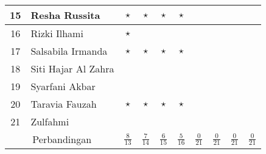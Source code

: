 \documentclass[a4paper]{tufte-handout}
\begin{document}
\begin{table}[!ht]
\begin{tabular}{cl|c|c|c|c|c|c|c|c}
15 	& Resha Russita				& $\star$ & $\star$ & $\star$ & $\star$ & & & & \\ \hline
16 	& Rizki Ilhami				& $\star$ & & & & & & & \\ \hline
17 	& Salsabila Irmanda			& $\star$ & $\star$ & $\star$ & $\star$ & & & & \\ \hline
18 	& Siti Hajar Al Zahra		& & & & & & & & \\ \hline
19 	& Syarfani Akbar			& & & & & & & & \\ \hline
20 	& Taravia Fauzah			& $\star$ & $\star$ & $\star$ & $\star$ & & & & \\ \hline
21 	& Zulfahmi					& & & & & & & & \\ \hline
\multicolumn{2}{c|}{Perbandingan}		& 
$\frac{8}{13}$ &
$\frac{7}{14}$ &
$\frac{6}{15}$ &
$\frac{5}{16}$ &
$\frac{0}{21}$ &
$\frac{0}{21}$ &
$\frac{0}{21}$ &
$\frac{0}{21}$ \\
\end{tabular}
\end{table}


\begin{comment}
\footnote{Mahasiswa yang hadir:
\begin{enumerate}
\item Adinda Awaliah
\item Adjie Yusmunandar
\item Arya Saputra
\item Cut Opy Mandalisa
\item Faiza Yuwafiqi
\item Jihan Dwi Sarah
\item M. Ikhsan
\item Muhammad Ikrammullah
\item Muhammad Munawir
\item Nadzura Kumaira
\item Nurani Harum Fardaniah
\item Nuraula Tafiza
\item Nurul Aflah
\item Rauzatinur Syah
\item Resha Russita
\item Rizki Ilhami
\item Salsabila Irmanda
\item Siti Hajar Al Zahra
\item Syarfani Akbar
\item Taravia Fauzah
\item Zulfahmi
\end{enumerate}}}
\end{comment}
\end{document}
